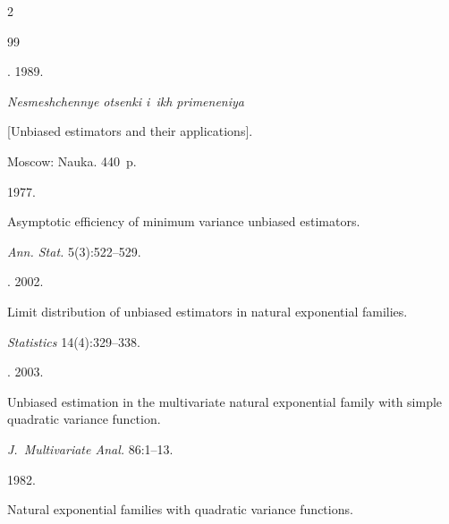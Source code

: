   \begin{multicols}{2}





\renewcommand{\bibname}{\protect\rmfamily References}







{\small\frenchspacing


 {%




 \begin{thebibliography}{99}




. 1989.


\textit{Nesmeshchennye otsenki i~ikh primeneniya}


 [Unbiased estimators and their applications].


 Moscow: Nauka. 440~p. \emph{ }






 1977.


 Asymptotic efficiency of minimum variance unbiased estimators.


\textit{Ann. Stat.} 5(3):522--529.






. 2002.


 Limit distribution of unbiased estimators in natural exponential families.


\textit{Statistics} 14(4):329--338.






. 2003.


 Unbiased estimation in the multivariate natural exponential family with simple quadratic variance function.


\textit{J.~Multivariate Anal.} 86:1--13.






 1982.


 Natural exponential families with quadratic variance functions.



\end{thebibliography}}}
\end{multicols}
